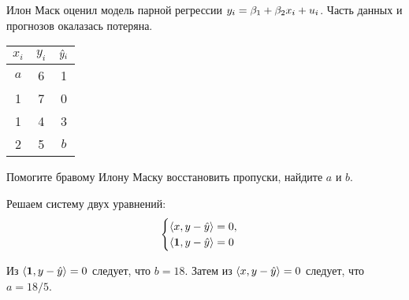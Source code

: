 \begin{problem}
Илон Маск оценил модель парной регрессии $y_i = \beta_1 + \beta_2 x_i + u_i$.
Часть данных и прогнозов окалазась потеряна. 

\begin{tabular}{ccc}
       \toprule
       $x_i$ & $y_i$ & $\hat{y}_i$ \\
       \midrule
       $a$ & 6 & 1 \\
       1 & 7 & 0 \\
       1 & 4 & 3 \\
       2 & 5 & $b$ \\
       \bottomrule
\end{tabular}
       
Помогите бравому Илону Маску восстановить пропуски, найдите $a$ и $b$. 
\begin{sol}
Решаем систему двух уравнений:
\[
\begin{cases}
       \langle x, y - \hat{y} \rangle = 0, \\
       \langle \boldsymbol{1}, y - \hat{y} \rangle = 0 
\end{cases}
\]

Из $\langle \boldsymbol{1}, y - \hat{y} \rangle = 0$ следует, что $b=18$. 
Затем из $\langle x, y - \hat{y} \rangle = 0$ следует, что $a=18/5$.
\end{sol}
\end{problem}
       




